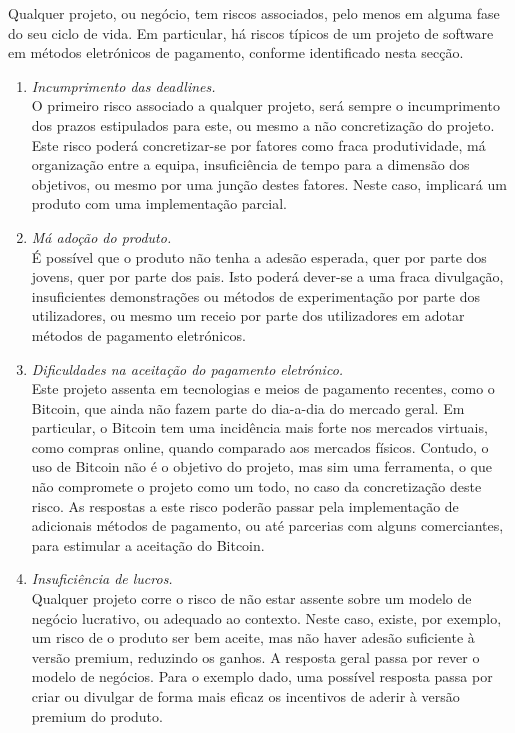 \documentclass[12pt,a4paper]{article}
\begin{document}
    Qualquer projeto, ou negócio, tem riscos associados, pelo menos em alguma fase do seu ciclo de vida. Em particular, há riscos típicos de um projeto de software em métodos eletrónicos de pagamento, conforme identificado nesta secção.

    \begin{enumerate}
      \item \emph{Incumprimento das deadlines.}\\
O primeiro risco associado a qualquer projeto, será sempre o incumprimento dos prazos estipulados para este, ou mesmo a não concretização do projeto. Este risco poderá concretizar-se por fatores como fraca produtividade, má organização entre a equipa, insuficiência de tempo para a dimensão dos objetivos, ou mesmo por uma junção destes fatores. Neste caso, implicará um produto com uma implementação parcial.
      \item \emph{Má adoção do produto.}\\
É possível que o produto não tenha a adesão esperada, quer por parte dos jovens, quer por parte dos pais. Isto poderá dever-se a uma fraca divulgação, insuficientes demonstrações ou métodos de experimentação por parte dos utilizadores, ou mesmo um receio por parte dos utilizadores em adotar métodos de pagamento eletrónicos.
      \item \emph{Dificuldades na aceitação do pagamento eletrónico.}\\
Este projeto assenta em tecnologias e meios de pagamento recentes, como o Bitcoin, que ainda não fazem parte do dia-a-dia do mercado geral. Em particular, o Bitcoin tem uma incidência mais forte nos mercados virtuais, como compras online, quando comparado aos mercados físicos. Contudo, o uso de Bitcoin não é o objetivo do projeto, mas sim uma ferramenta, o que não compromete o projeto como um todo, no caso da concretização deste risco. As respostas a este risco poderão passar pela implementação de adicionais métodos de pagamento, ou até parcerias com alguns comerciantes, para estimular a aceitação do Bitcoin.
      \item \emph{Insuficiência de lucros.}\\
      Qualquer projeto corre o risco de não estar assente sobre um modelo de negócio lucrativo, ou adequado ao contexto. Neste caso, existe, por exemplo, um risco de o produto ser bem aceite, mas não haver adesão suficiente à versão premium, reduzindo os ganhos. A resposta geral passa por rever o modelo de negócios. Para o exemplo dado, uma possível resposta passa por criar ou divulgar de forma mais eficaz os incentivos de aderir à versão premium do produto.
    \end{enumerate}
\end{document}
